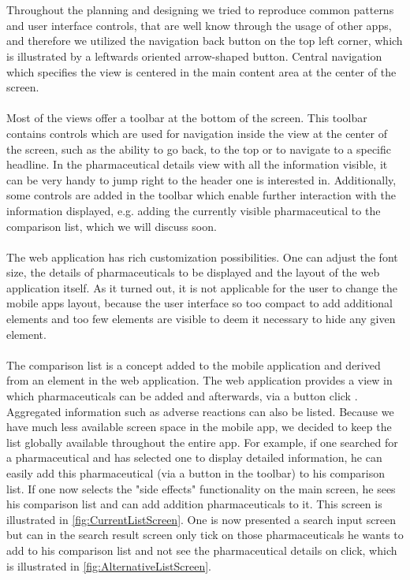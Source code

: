 \\
\\
Throughout the planning and designing we tried to reproduce common patterns and user interface controls, that are well know through the usage of other apps, and therefore we utilized the navigation back button on the top left corner, which is illustrated by a leftwards oriented arrow-shaped button. Central navigation which specifies the view is centered in the main content area at the center of the screen.
\\
\\
Most of the views offer a toolbar at the bottom of the screen. This toolbar contains controls which are used for navigation inside the view at the center of the screen, such as the ability to go back, to the top or to navigate to a specific headline. In the pharmaceutical details view with all the information visible, it can be very handy to jump right to the header one is interested in. Additionally, some controls are added in the toolbar which enable further interaction with the information displayed, e.g. adding the currently visible pharmaceutical to the comparison list, which we will discuss soon.
\\
\\
The web application has rich customization possibilities. One can adjust the font size, the details of pharmaceuticals to be displayed and the layout of the web application itself. As it turned out, it is not applicable for the user to change the mobile apps layout, because the user interface so too compact to add additional elements and too few elements are visible to deem it necessary to hide any given element.
\\
\\
The comparison list is a concept added to the mobile application and derived from an element in the web application. The web application provides a view in which pharmaceuticals can be added and afterwards, via a button click . Aggregated information such as adverse reactions can also be listed. Because we have much less available screen space in the mobile app, we decided to keep the list globally available throughout the entire app. For example, if one searched for a pharmaceutical and has selected one to display detailed information, he can easily add this pharmaceutical (via a button in the toolbar) to his comparison list. If one now selects the "side effects" functionality on the main screen, he sees his comparison list and can add addition pharmaceuticals to it. This screen is illustrated in \ref{fig:CurrentListScreen}. One is now presented a search input screen but can in the search result screen only tick on those pharmaceuticals he wants to add to his comparison list and not see the pharmaceutical details on click, which is illustrated in \ref{fig:AlternativeListScreen}.
